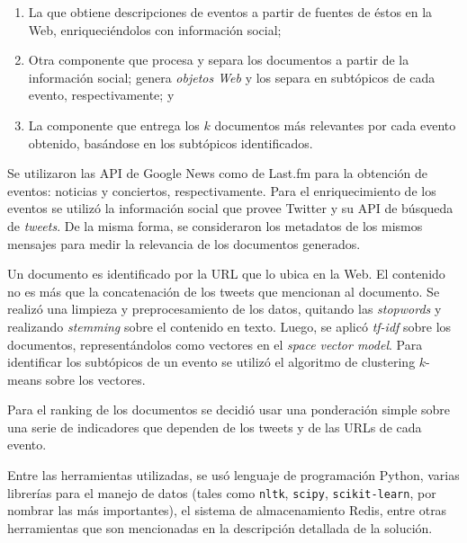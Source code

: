 \begin{enumerate}
\item La que obtiene descripciones de eventos a partir de fuentes de
      éstos en la Web, enriqueciéndolos con información social;
\item Otra componente que procesa y separa los documentos a partir de
      la información social; genera \emph{objetos Web} y los separa en
      subtópicos de cada evento, respectivamente; y
\item La componente que entrega los $k$ documentos más relevantes por
      cada evento obtenido, basándose en los subtópicos identificados.
\end{enumerate}
   Se utilizaron las API de Google News como de Last.fm para la
   obtención de eventos: noticias y conciertos, respectivamente. Para
   el enriquecimiento de los eventos se utilizó la información social
   que provee Twitter y su API de búsqueda de \emph{tweets}. De la misma
   forma, se consideraron los metadatos de los mismos mensajes para medir
   la relevancia de los documentos generados.

   Un documento es identificado por la URL que lo ubica en la Web. El
   contenido no es más que la concatenación de los tweets que
   mencionan al documento. Se realizó una limpieza y preprocesamiento
   de los datos, quitando las \emph{stopwords} y realizando \emph{stemming}
   sobre el contenido en texto. Luego, se aplicó \emph{tf-idf} sobre los
   documentos, representándolos como vectores en el \emph{space vector    model}. Para identificar los subtópicos de un evento se utilizó el
   algoritmo de clustering $k$-means sobre los vectores.

   Para el ranking de los documentos se decidió usar una ponderación
   simple sobre una serie de indicadores que dependen de los tweets y
   de las URLs de cada evento.

   Entre las herramientas utilizadas, se usó lenguaje de
   programación Python, varias librerías para el manejo de datos
   (tales como \texttt{nltk}, \texttt{scipy}, \texttt{scikit-learn}, por nombrar las más
   importantes), el sistema de almacenamiento Redis, entre otras
   herramientas que son mencionadas en la descripción detallada de la
   solución.